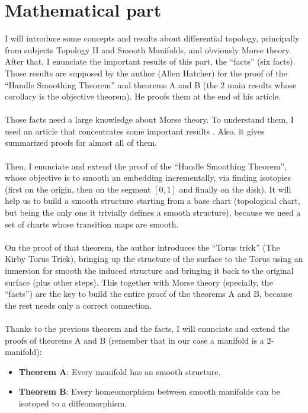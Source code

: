 \section*{Mathematical part}
I will introduce some concepts and results about differential topology, principally from subjects Topology II and Smooth Manifolds, and obviously Morse theory. After that, I enunciate the important results of this part, the ``facts'' (six facts). Those results are supposed by the author (Allen Hatcher) for the proof of the ``Handle Smoothing Theorem'' and theorems A and B (the $2$ main results whose corollary is the objective theorem). He proofs them at the end of his article.\\
\\Those facts need a large knowledge about Morse theory. To understand them, I used an article that concentrates some important results \cite{MorseTh1}. Also, it gives summarized proofs for almost all of them.\\
\\Then, I enunciate and extend the proof of the ``Handle Smoothing Theorem'', whose objective is to smooth an embedding incrementally, via finding isotopies (first on the origin, then on the segment $[0,1]$ and finally on the disk). It will help us to build a smooth structure starting from a base chart (topological chart, but being the only one it trivially defines a smooth structure), because we need a set of charts whose transition maps are smooth.\\
\\On the proof of that theorem, the author introduces the ``Torus trick'' (The Kirby Torus Trick), bringing up the structure of the surface to the Torus using an inmersion for smooth the induced structure and bringing it back to the original surface (plus other steps). This together with Morse theory (specially, the ``facts'') are the key to build the entire proof of the theorems A and B, because the rest needs only a correct connection.\\
\\Thanks to the previous theorem and the facts, I will enunciate and extend the proofs of theorems A and B (remember that in our case a manifold is a $2$-manifold):
\begin{itemize}
	\item \textbf{Theorem A}: Every manifold has an smooth structure.
	\item \textbf{Theorem B}: Every homeomorphism between smooth manifolds can be isotoped to a diffeomorphism.
\end{itemize}
